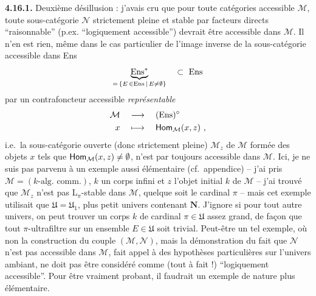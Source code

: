 \textbf{4.16.1.} Deuxième désillusion : j'avais cru que pour toute catégories accessible $\mathcal{M}$, toute %
sous-catégorie $\mathcal{N}$ strictement pleine et stable par facteurs directs “raisonnable” (p.ex. “logiquement accessible”) devrait être accessible dans $\mathcal{M}$. Il n'en est rien, même dans le cas particulier de l'image inverse de la sous-catégorie accessible dans Ens
\[
\underbrace{\mathrm{Ens}^*}_{=\,\{E\,\in\mathrm{Ens}\,\mid\, E\neq\emptyset\}} \quad\subset\ \mathrm{Ens}
\]
par un contrafoncteur accessible \textit{représentable}
\[
\begin{aligned}
\mathcal{M} \quad &\longrightarrow \quad (\mathrm{Ens})^\circ \\
x \quad &\longmapsto \quad \mathsf{Hom}_{\mathcal{M}}(x,z)\ ,
\end{aligned}
\]
i.e.\ la sous-catégorie ouverte (donc strictement pleine) $\mathcal{M}_z$ de $\mathcal{M}$ formée des objets $x$ tels que $\mathsf{Hom}_{\mathcal{M}}(x,z) \neq \emptyset$, n'est par toujours accessible dans $\mathcal{M}$. Ici, je ne suis pas parvenu à %
un exemple aussi élémentaire (cf.\ appendice) -- j'ai pris $\mathcal{M} = (k\text{-alg.\ comm.})$, $k$ un corps infini et $z$ l'objet initial $k$ de $\mathcal{M}$ -- j'ai trouvé que $\mathcal{M}_z$ n'est pas $\mathrm{L}_\pi$-stable dans $\mathcal{M}$, quelque soit le cardinal $\pi$ %
-- mais cet exemple utilisait que $\mathfrak{U} = \mathfrak{U}_1$, plus petit univers contenant $\mathbf{N}$. J'ignore si pour tout autre univers, on peut trouver un corps $k$ de cardinal $\pi \in \mathfrak{U}$ assez grand, de façon que tout $\pi$-ultrafiltre sur un ensemble $E \in \mathfrak{U}$ soit trivial. Peut-être
un tel exemple, où non la construction du couple $(\mathcal{M},\mathcal{N})$, mais la démonstration du fait que $\mathcal{N}$ n'est pas accessible dans $\mathcal{M}$, fait appel à des hypothèses particulières sur l'univers ambiant, ne doit pas être considéré comme (tout à fait !) “logiquement accessible”. Pour être vraiment probant, il faudrait un exemple de nature plus élémentaire.

